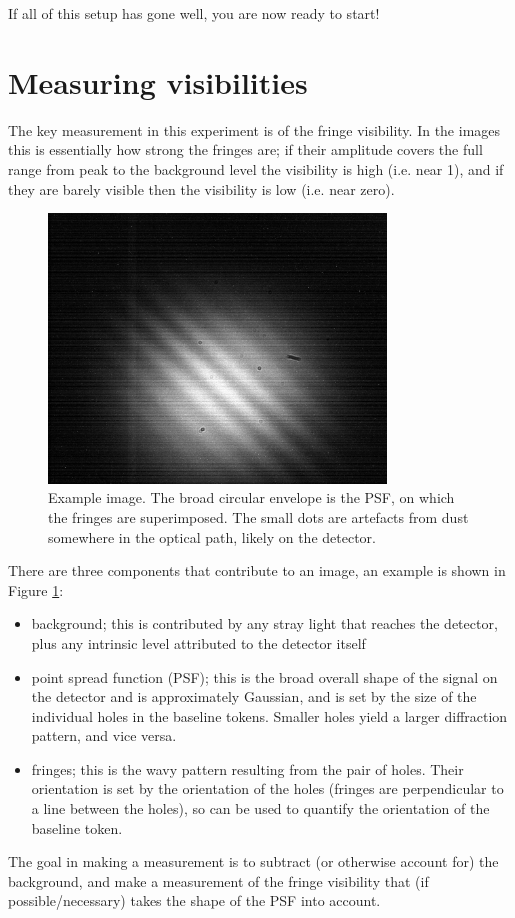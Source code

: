 \documentclass[11pt]{article}
\begin{document}
If all of this setup has gone well, you are now ready to start!

\clearpage
\section{Measuring visibilities}\label{sec:meas}

The key measurement in this experiment is of the fringe visibility. In the images this is essentially how strong the fringes are; if their amplitude covers the full range from peak to the background level the visibility is high (i.e. near 1), and if they are barely visible then the visibility is low (i.e. near zero).

\begin{figure}[h]
    \centering
    \includegraphics[width=0.8\textwidth]{doc/det-img.png}
    \caption{Example image. The broad circular envelope is the PSF, on which the fringes are superimposed. The small dots are artefacts from dust somewhere in the optical path, likely on the detector.}
    \label{fig:det-img}
\end{figure}

There are three components that contribute to an image, an example is shown in Figure \ref{fig:det-img}:
\begin{itemize}
    \item background; this is contributed by any stray light that reaches the detector, plus any intrinsic level attributed to the detector itself
    \item point spread function (PSF); this is the broad overall shape of the signal on the detector and is approximately Gaussian, and is set by the size of the individual holes in the baseline tokens. Smaller holes yield a larger diffraction pattern, and vice versa.
    \item fringes; this is the wavy pattern resulting from the pair of holes. Their orientation is set by the orientation of the holes (fringes are perpendicular to a line between the holes), so can be used to quantify the orientation of the baseline token.
\end{itemize}
The goal in making a measurement is to subtract (or otherwise account for) the background, and make a measurement of the fringe visibility that (if possible/necessary) takes the shape of the PSF into account.
\end{document}
